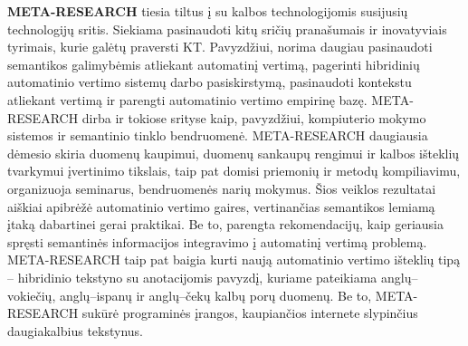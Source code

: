 \begin{multicols}{2}
\textbf{META-RESEARCH} tiesia tiltus į su kalbos technologijomis susijusių technologijų sritis. Siekiama pasinaudoti kitų sričių pranašumais ir inovatyviais tyrimais, kurie galėtų praversti KT. Pavyzdžiui, norima daugiau pasinaudoti semantikos galimybėmis atliekant automatinį vertimą, pagerinti hibridinių automatinio vertimo sistemų darbo pasiskirstymą, pasinaudoti kontekstu atliekant vertimą ir parengti automatinio vertimo empirinę bazę. META-RESEARCH dirba ir tokiose srityse kaip, pavyzdžiui, kompiuterio mokymo sistemos ir semantinio tinklo bendruomenė. META-RESEARCH daugiausia dėmesio skiria duomenų kaupimui, duomenų sankaupų rengimui ir kalbos išteklių tvarkymui įvertinimo tikslais, taip pat domisi priemonių ir metodų kompiliavimu, organizuoja seminarus, bendruomenės narių mokymus. Šios veiklos rezultatai aiškiai apibrėžė automatinio vertimo gaires, vertinančias semantikos lemiamą įtaką dabartinei gerai praktikai. Be to, parengta rekomendacijų, kaip geriausia spręsti semantinės informacijos integravimo į automatinį vertimą problemą. META-RESEARCH taip pat baigia kurti naują automatinio vertimo išteklių tipą – hibridinio tekstyno su anotacijomis pavyzdį, kuriame pateikiama anglų–vokiečių, anglų–ispanų ir anglų–čekų kalbų porų duomenų. Be to, META-RESEARCH sukūrė programinės įrangos, kaupiančios internete slypinčius daugiakalbius tekstynus.
\end{multicols}


\setcounter{section}{0}
\setcounter{figure}{0}

\cleardoublepage



